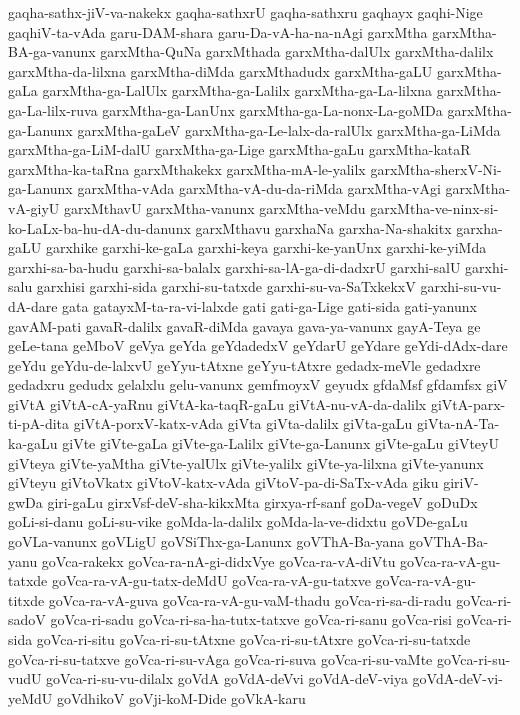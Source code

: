 {gaqha-sathx-jiV-va-nakekx
gaqha-sathxrU
gaqha-sathxru
gaqhayx
gaqhi-Nige
gaqhiV-ta-vAda
garu-DAM-shara
garu-Da-vA-ha-na-nAgi
garxMtha
garxMtha-BA-ga-vanunx
garxMtha-QuNa
garxMthada
garxMtha-dalUlx
garxMtha-dalilx
garxMtha-da-lilxna
garxMtha-diMda
garxMthadudx
garxMtha-gaLU
garxMtha-gaLa
garxMtha-ga-LalUlx
garxMtha-ga-Lalilx
garxMtha-ga-La-lilxna
garxMtha-ga-La-lilx-ruva
garxMtha-ga-LanUnx
garxMtha-ga-La-nonx-La-goMDa
garxMtha-ga-Lanunx
garxMtha-gaLeV
garxMtha-ga-Le-lalx-da-ralUlx
garxMtha-ga-LiMda
garxMtha-ga-LiM-dalU
garxMtha-ga-Lige
garxMtha-gaLu
garxMtha-kataR
garxMtha-ka-taRna
garxMthakekx
garxMtha-mA-le-yalilx
garxMtha-sherxV-Ni-ga-Lanunx
garxMtha-vAda
garxMtha-vA-du-da-riMda
garxMtha-vAgi
garxMtha-vA-giyU
garxMthavU
garxMtha-vanunx
garxMtha-veMdu
garxMtha-ve-ninx-si-ko-LaLx-ba-hu-dA-du-danunx
garxMthavu
garxhaNa
garxha-Na-shakitx
garxha-gaLU
garxhike
garxhi-ke-gaLa
garxhi-keya
garxhi-ke-yanUnx
garxhi-ke-yiMda
garxhi-sa-ba-hudu
garxhi-sa-balalx
garxhi-sa-lA-ga-di-dadxrU
garxhi-salU
garxhi-salu
garxhisi
garxhi-sida
garxhi-su-tatxde
garxhi-su-va-SaTxkekxV
garxhi-su-vu-dA-dare
gata
gatayxM-ta-ra-vi-lalxde
gati
gati-ga-Lige
gati-sida
gati-yanunx
gavAM-pati
gavaR-dalilx
gavaR-diMda
gavaya
gava-ya-vanunx
gayA-Teya
ge
geLe-tana
geMboV
geVya
geYda
geYdadedxV
geYdarU
geYdare
geYdi-dAdx-dare
geYdu
geYdu-de-lalxvU
geYyu-tAtxne
geYyu-tAtxre
gedadx-meVle
gedadxre
gedadxru
gedudx
gelalxlu
gelu-vanunx
gemfmoyxV
geyudx
gfdaMsf
gfdamfsx
giV
giVtA
giVtA-cA-yaRnu
giVtA-ka-taqR-gaLu
giVtA-nu-vA-da-dalilx
giVtA-parx-ti-pA-dita
giVtA-porxV-katx-vAda
giVta
giVta-dalilx
giVta-gaLu
giVta-nA-Ta-ka-gaLu
giVte
giVte-gaLa
giVte-ga-Lalilx
giVte-ga-Lanunx
giVte-gaLu
giVteyU
giVteya
giVte-yaMtha
giVte-yalUlx
giVte-yalilx
giVte-ya-lilxna
giVte-yanunx
giVteyu
giVtoVkatx
giVtoV-katx-vAda
giVtoV-pa-di-SaTx-vAda
giku
giriV-gwDa
giri-gaLu
girxVsf-deV-sha-kikxMta
girxya-rf-sanf
goDa-vegeV
goDuDx
goLi-si-danu
goLi-su-vike
goMda-la-dalilx
goMda-la-ve-didxtu
goVDe-gaLu
goVLa-vanunx
goVLigU
goVSiThx-ga-Lanunx
goVThA-Ba-yana
goVThA-Ba-yanu
goVca-rakekx
goVca-ra-nA-gi-didxVye
goVca-ra-vA-diVtu
goVca-ra-vA-gu-tatxde
goVca-ra-vA-gu-tatx-deMdU
goVca-ra-vA-gu-tatxve
goVca-ra-vA-gu-titxde
goVca-ra-vA-guva
goVca-ra-vA-gu-vaM-thadu
goVca-ri-sa-di-radu
goVca-ri-sadoV
goVca-ri-sadu
goVca-ri-sa-ha-tutx-tatxve
goVca-ri-sanu
goVca-risi
goVca-ri-sida
goVca-ri-situ
goVca-ri-su-tAtxne
goVca-ri-su-tAtxre
goVca-ri-su-tatxde
goVca-ri-su-tatxve
goVca-ri-su-vAga
goVca-ri-suva
goVca-ri-su-vaMte
goVca-ri-su-vudU
goVca-ri-su-vu-dilalx
goVdA
goVdA-deVvi
goVdA-deV-viya
goVdA-deV-vi-yeMdU
goVdhikoV
goVji-koM-Dide
goVkA-karu
}
